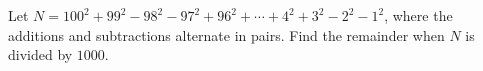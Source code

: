 Let $ N=100^2+99^2-98^2-97^2+96^2+\cdots+4^2+3^2-2^2-1^2$, where the additions and subtractions alternate in pairs. Find the remainder when $ N$ is divided by $ 1000$.